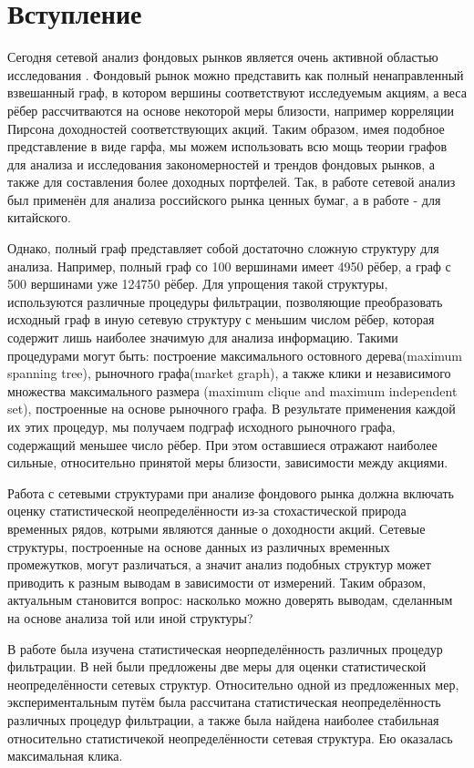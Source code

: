 \section{Вступление}

Сегодня сетевой анализ фондовых рынков является очень активной областью исследования \cite{intro_1} \cite{intro_2} \cite{intro_3} . Фондовый рынок можно представить как полный ненаправленный взвешанный граф, в котором вершины соответствуют исследуемым акциям, а веса рёбер рассчитваются на основе некоторой меры близости, например корреляции Пирсона доходностей соответствующих акций. Таким образом, имея подобное представление в виде гарфа, мы можем использовать всю мощь теории графов для анализа и исследования закономерностей и трендов фондовых рынков, а также для составления более доходных портфелей.  Так, в работе \cite{russian_analysis} сетевой анализ был применён для анализа российского рынка ценных бумаг, а в работе \cite{chinese_analysis} - для китайского. 


Однако, полный граф представляет собой достаточно сложную структуру для анализа. Например, полный граф со 100 вершинами имеет 4950 рёбер, а граф с 500 вершинами уже 124750 рёбер. Для упрощения такой структуры, используются различные процедуры фильтрации, позволяющие преобразовать исходный граф в иную сетевую структуру с меньшим числом рёбер, которая содержит лишь наиболее значимую для анализа информацию. Такими процедурами могут быть: построение максимального остовного дерева(maximum spanning tree)\cite{mst}, рыночного графа(market graph)\cite{mg}, а также клики и независимого множества максимального размера (maximum clique and maximum independent set), построенные на основе рыночного графа. В результате применения каждой их этих процедур, мы получаем подграф исходного рыночного графа, содержащий меньшее число рёбер. При этом оставшиеся отражают наиболее сильные, относительно принятой меры близости, зависимости между акциями.


Работа с сетевыми структурами при анализе фондового рынка  должна включать оценку статистической неопределённости из-за стохастической природа временных рядов, котрыми являются данные о доходности акций. Сетевые структуры, построенные на основе данных из различных временных промежутков, могут различаться, а значит анализ подобных структур может приводить к разным выводам в зависимости от измерений. Таким образом, актуальным становится вопрос: насколько можно доверять выводам, сделанным на основе анализа той или иной структуры? 

В работе \cite{measures} была изучена статистическая неорпеделённость различных процедур фильтрации. В ней были предложены две меры для оценки статистической неопределённости сетевых структур. Относительно одной из предложенных мер, экспериментальным путём была рассчитана статистическая неопределённость различных процедур фильтрации, а также была найдена наиболее стабильная относительно статистичекой неопределённости сетевая структура. Ею оказалась максимальная клика. 

